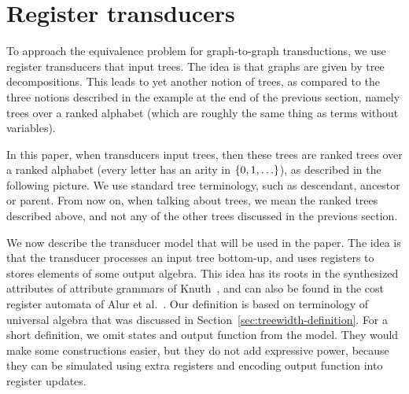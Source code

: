 \section{Register transducers}\label{sec:register-transducers}
To approach the equivalence problem for graph-to-graph transductions, we use register transducers that input trees. The idea is that graphs are given by tree decompositions. This leads to yet another notion of trees, as compared to the three notions described in the example at the end of the previous section, namely trees over a ranked alphabet (which are roughly the same thing as terms without variables).

In this paper, when transducers input trees, then these trees are  ranked trees over a ranked alphabet (every letter has an arity in $\{0,1,\ldots\}$), as described in the following picture.
 We use standard tree terminology, such as descendant, ancestor or parent. From now on, when talking about trees, we mean the ranked trees described above, and not any of the other trees discussed in the previous section.

We now describe the transducer model that will be used in the paper. The idea is that the transducer processes an input tree bottom-up, and uses registers to stores elements of some output algebra.  This idea has its roots in the synthesized attributes of attribute grammars of Knuth~\cite{Knuth:1968aa}, and can also be found in the cost register automata of Alur et al.~\cite[p.~15]{alurDantoniDeshmukhYuan2013}. Our definition is based on  terminology of universal algebra that was discussed in Section~\ref{sec:treewidth-definition}.
For a short definition, we omit states and output function from the model. They would make some constructions easier, but they do not add expressive power, because they can be simulated using extra registers and encoding output function into register updates.

